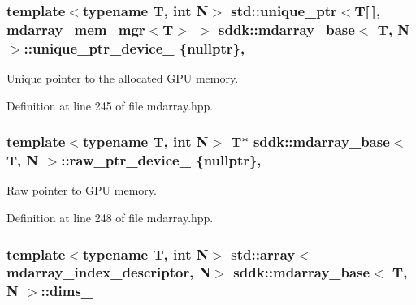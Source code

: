 \subsubsection[{unique\+\_\+ptr\+\_\+device\+\_\+}]{\setlength{\rightskip}{0pt plus 5cm}template$<$typename T, int N$>$ std\+::unique\+\_\+ptr$<$T\mbox{[}$\,$\mbox{]}, {\bf mdarray\+\_\+mem\+\_\+mgr}$<$T$>$ $>$ {\bf sddk\+::mdarray\+\_\+base}$<$ T, N $>$\+::unique\+\_\+ptr\+\_\+device\+\_\+ \{nullptr\}\hspace{0.3cm}{\ttfamily [mutable]}, {\ttfamily [protected]}}\label{classsddk_1_1mdarray__base_a956a63062c0919ace1afb44f6ed60e0c}


Unique pointer to the allocated G\+P\+U memory. 



Definition at line 245 of file mdarray.\+hpp.

\hypertarget{classsddk_1_1mdarray__base_a550cb86fe97cca94a263040970cdd8f4}{}
\subsubsection[{raw\+\_\+ptr\+\_\+device\+\_\+}]{\setlength{\rightskip}{0pt plus 5cm}template$<$typename T, int N$>$ T$\ast$ {\bf sddk\+::mdarray\+\_\+base}$<$ T, N $>$\+::raw\+\_\+ptr\+\_\+device\+\_\+ \{nullptr\}\hspace{0.3cm}{\ttfamily [mutable]}, {\ttfamily [protected]}}\label{classsddk_1_1mdarray__base_a550cb86fe97cca94a263040970cdd8f4}


Raw pointer to G\+P\+U memory. 



Definition at line 248 of file mdarray.\+hpp.

\hypertarget{classsddk_1_1mdarray__base_a06385cbaf87e14e02057f844e9acc3de}{}
\subsubsection[{dims\+\_\+}]{\setlength{\rightskip}{0pt plus 5cm}template$<$typename T, int N$>$ std\+::array$<${\bf mdarray\+\_\+index\+\_\+descriptor}, N$>$ {\bf sddk\+::mdarray\+\_\+base}$<$ T, N $>$\+::dims\+\_\+\hspace{0.3cm}{\ttfamily [protected]}}\label{classsddk_1_1mdarray__base_a06385cbaf87e14e02057f844e9acc3de}


